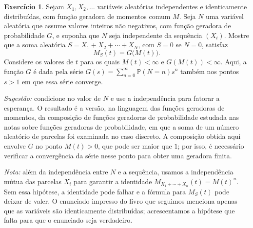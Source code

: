 \documentclass[12pt,portuguese]{article}
\theoremstyle{definition}
\theoremstyle{plainexercise}
\theoremstyle{starredexercise}
\newtheorem{starredexercise}[exercise]{Exercício}
\theoremstyle{definition}
\begin{document}
\begin{starredexercise}\label{exercise:gw-7-62}
  Sejam $X_1, X_2, \ldots$ variáveis aleatórias independentes e identicamente
  distribuídas, com função geradora de momentos comum $M$. Seja $N$ uma
  variável aleatória que
  assume valores inteiros não negativos, com função geradora de probabilidade
  $G$, e suponha que $N$ seja independente da sequência $(X_i)$. Mostre que a
  soma aleatória $S = X_1 + X_2 + \cdots + X_N$, com $S=0$ se $N=0$,
  satisfaz
  \[
    M_S(t) = G\bigl(M(t)\bigr).
  \]
  Considere os valores de $t$ para os quais $M(t)<\infty$ e
  $G(M(t))<\infty$. Aqui, a função $G$ é dada pela série
  $G(s)=\sum_{n=0}^{\infty}\mathbb{P}(N=n)s^n$ também nos pontos
  $s>1$ em que essa série converge.

  \noindent\emph{Sugestão:} condicione no valor de $N$ e use a independência para fatorar
  a esperança. O resultado é a versão, na linguagem das funções geradoras de
  momentos, da composição de funções geradoras de probabilidade estudada nas
  notas sobre funções geradoras de probabilidade, em que a soma de um número
  aleatório de parcelas foi examinada no caso discreto. A composição obtida aqui
  envolve $G$ no ponto $M(t)>0$, que pode ser maior que $1$; por isso,
  é necessário verificar a convergência da série nesse ponto para obter
  uma geradora finita.

  \bigskip 
	
  \noindent\emph{Nota:} além da independência entre $N$ e a sequência,
  usamos a independência mútua das parcelas $X_i$ para garantir a identidade
  $M_{X_1+\cdots+X_n}(t)=M(t)^n$. Sem essa hipótese, a identidade pode
  falhar e a fórmula para $M_S(t)$ pode deixar de valer.
  O enunciado impresso do livro que seguimos menciona apenas que as
  variáveis são identicamente distribuídas; acrescentamos a hipótese que falta
  para que o enunciado seja verdadeiro.
\end{starredexercise}



\end{document}
